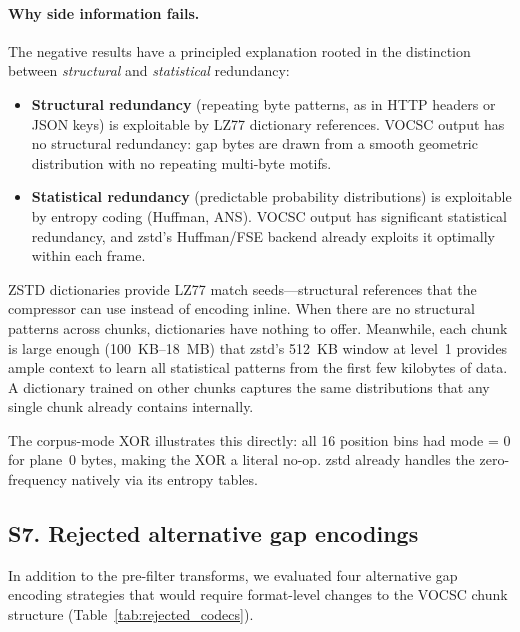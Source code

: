 \documentclass[10pt,twocolumn,letterpaper]{article}
\begin{document}
\paragraph{Why side information fails.}
The negative results have a principled explanation rooted in the distinction between \emph{structural} and \emph{statistical} redundancy:

\begin{itemize}
\item \textbf{Structural redundancy} (repeating byte patterns, as in HTTP headers or JSON keys) is exploitable by LZ77 dictionary references. VOCSC output has no structural redundancy: gap bytes are drawn from a smooth geometric distribution with no repeating multi-byte motifs.
\item \textbf{Statistical redundancy} (predictable probability distributions) is exploitable by entropy coding (Huffman, ANS). VOCSC output has significant statistical redundancy, and zstd's Huffman/FSE backend already exploits it optimally within each frame.
\end{itemize}

ZSTD dictionaries provide LZ77 match seeds---structural references that the compressor can use instead of encoding inline.
When there are no structural patterns across chunks, dictionaries have nothing to offer.
Meanwhile, each chunk is large enough (100~KB--18~MB) that zstd's 512~KB window at level~1 provides ample context to learn all statistical patterns from the first few kilobytes of data.
A dictionary trained on other chunks captures the same distributions that any single chunk already contains internally.

The corpus-mode XOR illustrates this directly: all 16 position bins had mode = 0 for plane~0 bytes, making the XOR a literal no-op.  zstd already handles the zero-frequency natively via its entropy tables.

\subsection*{S7. Rejected alternative gap encodings}

In addition to the pre-filter transforms, we evaluated four alternative gap encoding strategies that would require format-level changes to the VOCSC chunk structure (Table~\ref{tab:rejected_codecs}).
\end{document}
